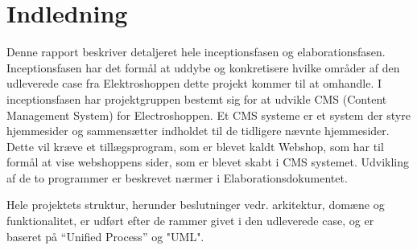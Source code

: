 \thispagestyle{fancy}
\section{Indledning}
Denne rapport beskriver detaljeret hele inceptionsfasen og elaborationsfasen. Inceptionsfasen har det formål at uddybe og konkretisere hvilke områder af den udleverede case fra Elektroshoppen dette projekt kommer til at omhandle. I inceptionsfasen har projektgruppen bestemt sig for at udvikle CMS (Content Management System) for Electroshoppen. Et CMS systeme er et system der styre hjemmesider og sammensætter indholdet til de tidligere nævnte hjemmesider. Dette vil kræve et tillægsprogram, som er blevet kaldt Webshop, som har til formål at vise webshoppens sider, som er blevet skabt i CMS systemet. Udvikling af de to programmer er beskrevet nærmer i Elaborationsdokumentet.

Hele projektets struktur, herunder beslutninger vedr. arkitektur, domæne og funktionalitet, er udført efter de rammer givet i den udleverede case, og er baseret på “Unified Process” og "UML".